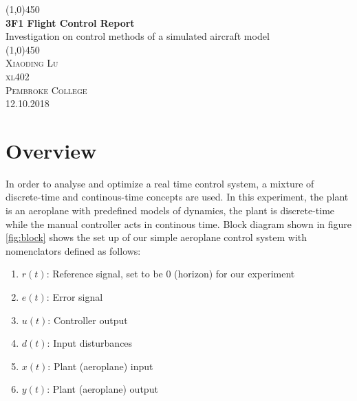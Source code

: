 \documentclass{article}
\begin{document}
\begin{titlepage}
	\begin{center}
	\line(1,0){450}\\
	[0.25in]
	\huge{\bfseries 3F1 Flight Control Report} \\
	[0.25in]
     \large Investigation on control methods of a simulated aircraft model \\
     \line(1,0){450} \\
	[12cm]
	\textsc{\Large Xiaoding Lu \\[1cm] xl402 \\ Pembroke College \\[1.2cm] 12.10.2018}\\
	\end{center}
	\begin{flushright}

	\begin{figure}[htp]
	\begin{flushright}
	\end{flushright}
	\end{figure}
	\end{flushright}

	\vspace{2cm}

\end{titlepage}

\cleardoublepage
{}
\cleardoublepage
{}
\section{Overview}
In order to analyse and optimize a real time control system, a mixture of discrete-time and continous-time concepts are used. In this experiment, the plant is an aeroplane with predefined models of dynamics, the plant is discrete-time while the manual controller acts in continous time. Block diagram shown in figure \ref{fig:block} shows the set up of our simple aeroplane control system with nomenclators defined as follows:
\begin{enumerate}
	\item $r(t)$: Reference signal, set to be 0 (horizon) for our experiment
	\item $e(t)$: Error signal
	\item $u(t)$: Controller output
	\item $d(t)$: Input disturbances
	\item $x(t)$: Plant (aeroplane) input
	\item $y(t)$: Plant (aeroplane) output
\end{enumerate}
\end{document}
